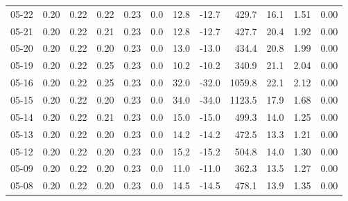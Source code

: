 \begin{threeparttable}
{\begin{tabular}{lrrrrrrrrrrr}
  05-22 &          0.20 &          0.22 &          0.22 &        0.23 &                 0.0 &                12.8 &      -12.7 &               429.7 &             16.1 &            1.51 &                   0.00 \\
  05-21 &          0.20 &          0.22 &          0.21 &        0.23 &                 0.0 &                12.8 &      -12.7 &               427.7 &             20.4 &            1.92 &                   0.00 \\
  05-20 &          0.20 &          0.22 &          0.20 &        0.23 &                 0.0 &                13.0 &      -13.0 &               434.4 &             20.8 &            1.99 &                   0.00 \\
  05-19 &          0.20 &          0.22 &          0.25 &        0.23 &                 0.0 &                10.2 &      -10.2 &               340.9 &             21.1 &            2.04 &                   0.00 \\
  05-16 &          0.20 &          0.22 &          0.25 &        0.23 &                 0.0 &                32.0 &      -32.0 &              1059.8 &             22.1 &            2.12 &                   0.00 \\
  05-15 &          0.20 &          0.22 &          0.20 &        0.23 &                 0.0 &                34.0 &      -34.0 &              1123.5 &             17.9 &            1.68 &                   0.00 \\
  05-14 &          0.20 &          0.22 &          0.21 &        0.23 &                 0.0 &                15.0 &      -15.0 &               499.3 &             14.0 &            1.25 &                   0.00 \\
  05-13 &          0.20 &          0.22 &          0.20 &        0.23 &                 0.0 &                14.2 &      -14.2 &               472.5 &             13.3 &            1.21 &                   0.00 \\
  05-12 &          0.20 &          0.22 &          0.20 &        0.23 &                 0.0 &                15.2 &      -15.2 &               504.8 &             14.0 &            1.30 &                   0.00 \\
  05-09 &          0.20 &          0.22 &          0.20 &        0.23 &                 0.0 &                11.0 &      -11.0 &               362.3 &             13.5 &            1.27 &                   0.00 \\
  05-08 &          0.20 &          0.22 &          0.20 &        0.23 &                 0.0 &                14.5 &      -14.5 &               478.1 &             13.9 &            1.35 &                   0.00 \\

\end{tabular}}
\end{threeparttable}

